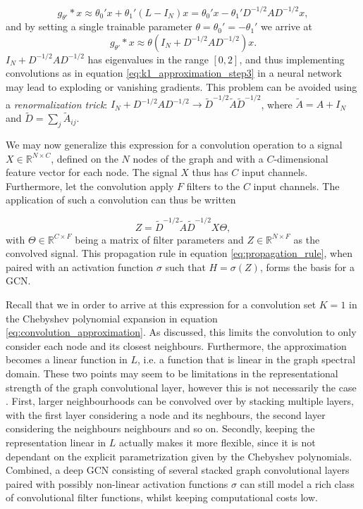 \begin{equation}
    g_{\theta'} * x \approx \theta_0' x + \theta_1' \left(L - I_N \right)x = \theta_0' x - \theta_1' D^{-1/2}AD^{-1/2}x ,
    \label{eq:k1_approximation_step2}
\end{equation}
and by setting a single trainable parameter $\theta = \theta_0' = -\theta_1'$ we arrive at 
\begin{equation}
    g_{\theta'} * x \approx \theta \left(I_N + D^{-1/2}AD^{-1/2} \right)x. 
    \label{eq:k1_approximation_step3}
\end{equation}
$I_N + D^{-1/2}AD^{-1/2}$ has eigenvalues in the range $[0, 2]$, and thus implementing convolutions as in equation \eqref{eq:k1_approximation_step3} in a neural network may lead to exploding or vanishing gradients. This problem can be avoided using a \textit{renormalization trick}: $I_N + D^{-1/2}AD^{-1/2} \rightarrow \tilde{D}^{-1/2} \tilde{A} \tilde{D}^{-1/2}$, where $\tilde{A} = A + I_N$ and $\tilde{D} = \sum_j \tilde{A}_{ij}$.

We may now generalize this expression for a convolution operation to a signal $X \in \mathbb{R}^{N \times C}$, defined on the $N$ nodes of the graph and with a $C$-dimensional feature vector for each node. The signal $X$ thus has $C$ input channels. Furthermore, let the convolution apply $F$ filters to the $C$ input channels. The application of such a convolution can thus be written

\begin{equation}
    Z = \tilde{D}^{-1/2} \tilde{A} \tilde{D}^{-1/2} X \Theta,
    \label{eq:propagation_rule}
\end{equation}
with $\Theta \in \mathbb{R}^{C\times F}$ being a matrix of filter parameters and $Z \in \mathbb{R}^{N\times F}$ as the convolved signal. This propagation rule in equation \eqref{eq:propagation_rule}, when paired with an activation function $\sigma$ such that $H = \sigma\left(Z \right)$, forms the basis for a GCN. 

Recall that we in order to arrive at this expression for a convolution set $K=1$ in the Chebyshev polynomial expansion in equation \eqref{eq:convolution_approximation}. As discussed, this limits the convolution to only consider each node and its closest neighbours. Furthermore, the approximation becomes a linear function in $L$, i.e. a function that is linear in the graph spectral domain. These two points may seem to be limitations in the representational strength of the graph convolutional layer, however this is not necessarily the case \cite{kipf_semi_supervised}. First, larger neighbourhoods can be convolved over by stacking multiple layers, with the first layer considering a node and its neghbours, the second layer considering the neighbours neighbours and so on. Secondly, keeping the representation linear in $L$ actually makes it more flexible, since it is not dependant on the explicit parametrization given by the Chebyshev polynomials. Combined, a deep GCN consisting of several stacked graph convolutional layers paired with possibly non-linear activation functions $\sigma$ can still model a rich class of convolutional filter functions, whilst keeping computational costs low. 


